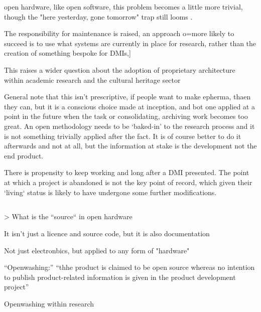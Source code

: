 open hardware, like open software, this problem becomes a little more trivial, though the "here yesterday, gone tomorrow" trap still looms \cite{horowitz_art_2015}. 

The responsibility for maintenance is raised, an approach o=more likely to succeed is to use what systems are currently in place for research, rather than the creation of something bespoke for DMIs,]


This raises a wider question about the adoption of proprietary architecture within academic research and the cultural heritage sector

General note that this isn't prescriptive, if people want to make epherma, thaen they can, but it is a conscious choice made at inception, and bot one applied at a point in the future when the task or consolidating, archiving work becomes too great. An open methodology needs to be `baked-in' to the research process and it is not something trivially applied after the fact. It is of course better to do it afterwards and not at all, but the information at stake is the development not the end product. 

There is propensity to keep working and long after a DMI presented. The point at which a project is abandoned is not the key point of record, which given their `living` status is likely to have undergone some further modifications.

\subsection{\cite{bonvoisin_source_2017}}

> What is the ``source`` in open hardware

It isn't just a licence and source code, but it is also documentation

Not just electronbics, but applied to any form of "hardware"

``Openwashing:'' ``thhe product is claimed to be open source whereas no intention to publish product-related information is given in the product development project''

Openwashing within research

\cite{oellermann_open_2022}



